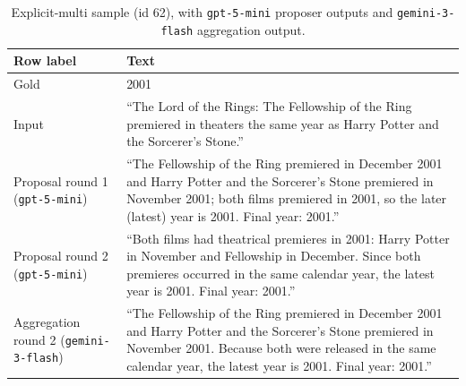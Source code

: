 \begin{table}[t]
  \scriptsize
  \centering
  \caption{Explicit-multi sample (id 62), with \texttt{gpt-5-mini} proposer outputs and \texttt{gemini-3-flash} aggregation output.}
  \label{tab:three-agent-explicit-multi-example}
  \begin{tabular}{|p{}|p{}|}
    \hline
    Row label & Text \\
    \hline
    Gold &
    2001 \\
    \hline
    Input &
    ``The Lord of the Rings: The Fellowship of the Ring premiered in theaters the same year as Harry Potter and the Sorcerer's Stone.'' \\
    \hline
    Proposal round 1 (\texttt{gpt-5-mini}) &
    ``The Fellowship of the Ring premiered in December 2001 and Harry Potter and the Sorcerer's Stone premiered in November 2001; both films premiered in 2001, so the later (latest) year is 2001. Final year: 2001.'' \\
    \hline
    Proposal round 2 (\texttt{gpt-5-mini}) &
    ``Both films had theatrical premieres in 2001: Harry Potter in November and Fellowship in December. Since both premieres occurred in the same calendar year, the latest year is 2001. Final year: 2001.'' \\
    \hline
    Aggregation round 2 (\texttt{gemini-3-flash}) &
    ``The Fellowship of the Ring premiered in December 2001 and Harry Potter and the Sorcerer's Stone premiered in November 2001. Because both were released in the same calendar year, the latest year is 2001. Final year: 2001.'' \\
    \hline
  \end{tabular}
\end{table}

